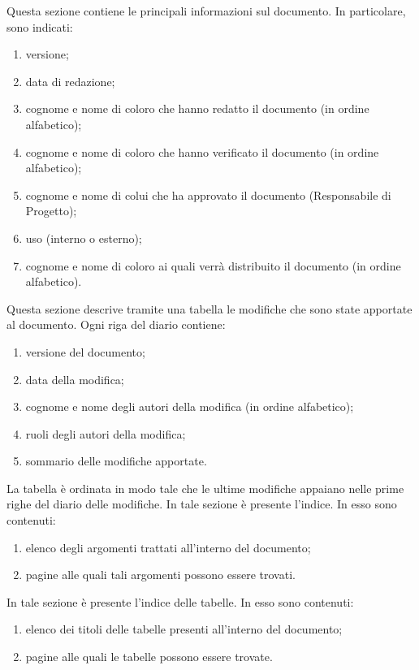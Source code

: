 				Questa sezione contiene le principali informazioni sul documento. In particolare, sono indicati:
				\begin{enumerate}
					\item versione;
					\item data di redazione;
					\item cognome e nome di coloro che hanno redatto il documento (in ordine alfabetico);
					\item cognome e nome di coloro che hanno verificato il documento (in ordine alfabetico);
					\item cognome e nome di colui che ha approvato il documento (Responsabile di Progetto);
					\item uso (interno o esterno);
					\item cognome e nome di coloro ai quali verrà distribuito il documento (in ordine alfabetico).
				\end{enumerate}
				Questa sezione descrive tramite una tabella le modifiche che sono state apportate al documento. Ogni riga del diario contiene:
				\begin{enumerate}
					\item versione del documento;
					\item data della modifica;
					\item cognome e nome degli autori della modifica (in ordine alfabetico);
					\item ruoli degli autori della modifica;
					\item sommario delle modifiche apportate.
				\end{enumerate}
				La tabella è ordinata in modo tale che le ultime modifiche appaiano nelle prime righe del diario delle modifiche.
				In tale sezione è presente l’indice. In esso sono contenuti:
				\begin{enumerate}
					\item elenco degli argomenti trattati all’interno del documento;
					\item pagine alle quali tali argomenti possono essere trovati.
				\end{enumerate}
				In tale sezione è presente l’indice delle tabelle. In esso sono contenuti:
				\begin{enumerate}
					\item elenco dei titoli delle tabelle presenti all’interno del documento;
					\item pagine alle quali le tabelle possono essere trovate.
				\end{enumerate}
